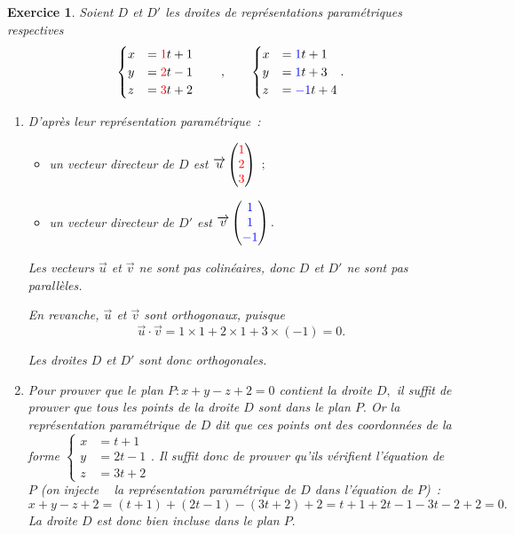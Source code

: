\documentclass[10pt]{article}
\newtheorem{exo}{Exercice}
\begin{document}
\begin{exo}

Soient $D$ et $D'$ les droites de représentations paramétriques respectives
\[\begin{cases}x&=\textcolor{red}{1}t+1\\y&=\textcolor{red}{2}t-1\\z&=\textcolor{red}{3}t+2\end{cases}\qquad,\qquad \begin{cases}x&=\textcolor{blue}{1}t+1\\y&=\textcolor{blue}{1}t+3\\z&=\textcolor{blue}{-1}t+4\end{cases}.\]

\begin{enumerate}
\item D'après leur représentation paramétrique~:
\begin{itemize}
\item[\textbullet] un vecteur directeur de $D$ est $\overrightarrow{u}\begin{pmatrix}\textcolor{red}{1}\\\textcolor{red}{2}\\\textcolor{red}{3}\end{pmatrix}~;$
\item[\textbullet] un vecteur directeur de $D'$ est $\overrightarrow{v}\begin{pmatrix}\textcolor{blue}{1}\\\textcolor{blue}{1}\\\textcolor{blue}{-1}\end{pmatrix}.$
\end{itemize}

Les vecteurs $\overrightarrow{u}$ et $\overrightarrow{v}$ ne sont pas colinéaires, donc $D$ et $D'$ ne sont pas parallèles.

\medskip

En revanche, $\overrightarrow{u}$ et $\overrightarrow{v}$ sont orthogonaux, puisque
\[\overrightarrow{u}\cdot \overrightarrow{v}=1\times 1+2\times 1+3\times (-1)=0.\]

Les droites $D$ et $D'$ sont donc orthogonales.
\item Pour prouver que le plan $P:x+y-z+2=0$ contient la droite $D,$ il suffit de prouver que tous les points de la droite $D$ sont dans le plan $P.$ Or la représentation paramétrique de $D$ dit que ces points ont des coordonnées de la forme $\begin{cases}x&=t+1\\y&=2t-1\\z&=3t+2\end{cases}.$ Il suffit donc de prouver qu'ils vérifient l'équation de $P$ (on \og injecte \fg~{} la représentation paramétrique de $D$ dans l'équation de $P$)~:
\[x+y-z+2=(t+1)+(2t-1)-(3t+2)+2=t+1+2t-1-3t-2+2=0.\] La droite $D$ est donc bien incluse dans le plan $P.$
\medskip


\end{enumerate}
\end{exo}
\end{document}
